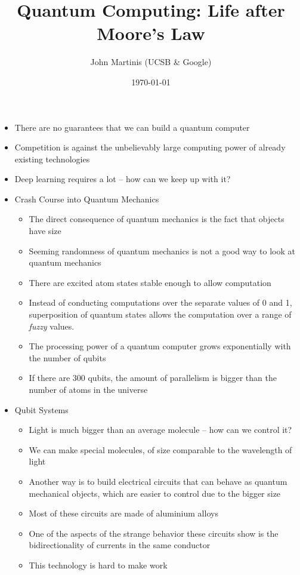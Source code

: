 \documentclass[11pt]{article}
\author{John Martinis (UCSB \& Google)}
\date{\today}
\title{Quantum Computing: Life after Moore's Law}
\begin{document}
\maketitle
\label{sec:org950691b}
\begin{itemize}
\item There are no guarantees that we can build a quantum computer
\item Competition is against the unbelievably large computing power of already existing technologies
\item Deep learning requires a lot -- how can we keep up with it?
\item Crash Course into Quantum Mechanics
\begin{itemize}
\item The direct consequence of quantum mechanics is the fact that objects have size
\item Seeming randomness of quantum mechanics is not a good way to look at quantum mechanics
\item There are excited atom states stable enough to allow computation
\item Instead of conducting computations over the separate values of 0 and 1, superposition of quantum states allows the computation over a range of \emph{fuzzy} values.
\item The processing power of a quantum computer grows exponentially with the number of qubits
\item If there are 300 qubits, the amount of parallelism is bigger than the number of atoms in the universe
\end{itemize}
\item Qubit Systems
\begin{itemize}
\item Light is much bigger than an average molecule -- how can we control it?
\item We can make special molecules, of size comparable to the wavelength of light
\item Another way is to build electrical circuits that can behave as quantum mechanical objects, which are easier to control due to the bigger size
\item Most of these circuits are made of aluminium alloys
\item One of the aspects of the strange behavior these circuits show is the bidirectionality of currents in the same conductor
\item This technology is hard to make work
\end{itemize}

\end{itemize}
\end{document}
